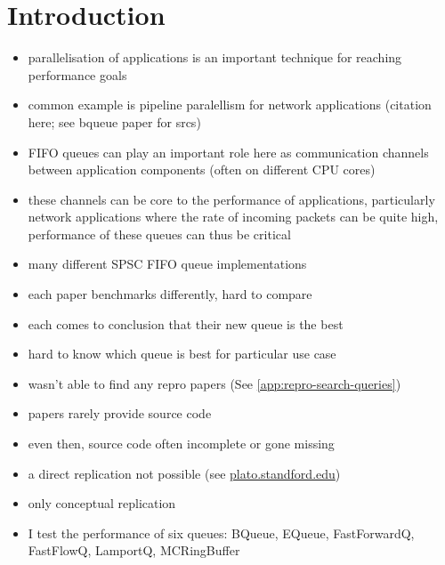 \section{Introduction}
\begin{itemize}
    \item parallelisation of applications is an important technique for reaching performance goals
    \item common example is pipeline paralellism for network applications (citation here; see bqueue paper for srcs)
    \item FIFO queues can play an important role here as communication channels between application components (often on different CPU cores)
    \item these channels can be core to the performance of applications, particularly network applications
        where the rate of incoming packets can be quite high, performance of these queues can thus be critical
    \item many different SPSC FIFO queue implementations
    \item each paper benchmarks differently, hard to compare
    \item each comes to conclusion that their new queue is the best
    \item hard to know which queue is best for particular use case
    \item wasn't able to find any repro papers (See \autoref{app:repro-search-queries})
    \item papers rarely provide source code
    \item even then, source code often incomplete or gone missing
    \item a direct replication not possible (see
            \href{https://plato.stanford.edu/entries/scientific-reproducibility/#:~:text=direct
                replication%
                conceptual%
                to%
        }{plato.standford.edu})
    \item only conceptual replication
    \item I test the performance of six queues: BQueue, EQueue, FastForwardQ, FastFlowQ, LamportQ, MCRingBuffer
        \cite{B-Queue}\cite{EQueue}\cite{FastForward}\cite{FastFlowGithub}\cite{Lamport}\cite{MCRingBuffer}

\end{itemize}
